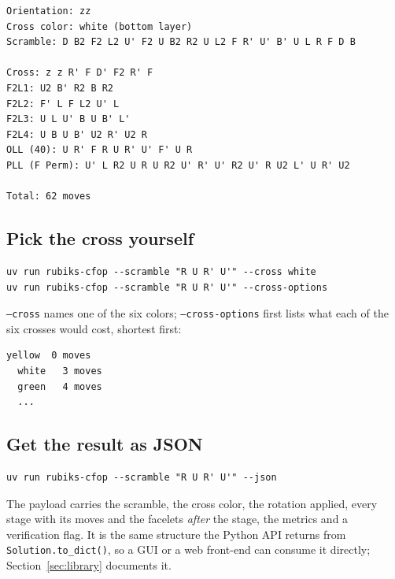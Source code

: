\begin{lstlisting}[style=shell]
Orientation: zz
Cross color: white (bottom layer)
Scramble: D B2 F2 L2 U' F2 U B2 R2 U L2 F R' U' B' U L R F D B

Cross: z z R' F D' F2 R' F
F2L1: U2 B' R2 B R2
F2L2: F' L F L2 U' L
F2L3: U L U' B U B' L'
F2L4: U B U B' U2 R' U2 R
OLL (40): U R' F R U R' U' F' U R
PLL (F Perm): U' L R2 U R U R2 U' R' U' R2 U' R U2 L' U R' U2

Total: 62 moves
\end{lstlisting}

\subsection{Pick the cross yourself}

\begin{lstlisting}[style=shell]
uv run rubiks-cfop --scramble "R U R' U'" --cross white
uv run rubiks-cfop --scramble "R U R' U'" --cross-options
\end{lstlisting}

\texttt{--cross} names one of the six colors; \texttt{--cross-options} first lists
what each of the six crosses would cost, shortest first:

\begin{lstlisting}[style=shell]
  yellow  0 moves
  white   3 moves
  green   4 moves
  ...
\end{lstlisting}

\subsection{Get the result as JSON}

\begin{lstlisting}[style=shell]
uv run rubiks-cfop --scramble "R U R' U'" --json
\end{lstlisting}

The payload carries the scramble, the cross color, the rotation applied, every
stage with its moves and the facelets \emph{after} the stage, the metrics and a
verification flag.  It is the same structure the Python API returns from
\texttt{Solution.to\_dict()}, so a GUI or a web front-end can consume it directly;
Section~\ref{sec:library} documents it.
